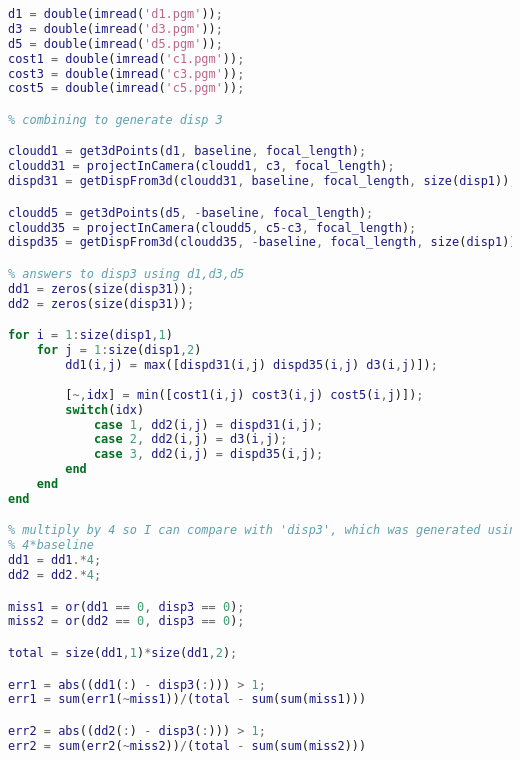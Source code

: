\documentclass{article}
\begin{document}
\begin{lstlisting}[language=Matlab]
d1 = double(imread('d1.pgm'));
d3 = double(imread('d3.pgm'));
d5 = double(imread('d5.pgm'));
cost1 = double(imread('c1.pgm'));
cost3 = double(imread('c3.pgm'));
cost5 = double(imread('c5.pgm'));

% combining to generate disp 3

cloudd1 = get3dPoints(d1, baseline, focal_length);
cloudd31 = projectInCamera(cloudd1, c3, focal_length);
dispd31 = getDispFrom3d(cloudd31, baseline, focal_length, size(disp1));

cloudd5 = get3dPoints(d5, -baseline, focal_length);
cloudd35 = projectInCamera(cloudd5, c5-c3, focal_length);
dispd35 = getDispFrom3d(cloudd35, -baseline, focal_length, size(disp1));

% answers to disp3 using d1,d3,d5
dd1 = zeros(size(disp31));
dd2 = zeros(size(disp31));

for i = 1:size(disp1,1)
    for j = 1:size(disp1,2)
        dd1(i,j) = max([dispd31(i,j) dispd35(i,j) d3(i,j)]);
        
        [~,idx] = min([cost1(i,j) cost3(i,j) cost5(i,j)]);
        switch(idx)
            case 1, dd2(i,j) = dispd31(i,j);
            case 2, dd2(i,j) = d3(i,j);
            case 3, dd2(i,j) = dispd35(i,j);
        end
    end
end

% multiply by 4 so I can compare with 'disp3', which was generated using
% 4*baseline
dd1 = dd1.*4;
dd2 = dd2.*4;

miss1 = or(dd1 == 0, disp3 == 0);
miss2 = or(dd2 == 0, disp3 == 0);

total = size(dd1,1)*size(dd1,2);

err1 = abs((dd1(:) - disp3(:))) > 1;
err1 = sum(err1(~miss1))/(total - sum(sum(miss1)))

err2 = abs((dd2(:) - disp3(:))) > 1;
err2 = sum(err2(~miss2))/(total - sum(sum(miss2)))


\end{lstlisting}
\end{document}
